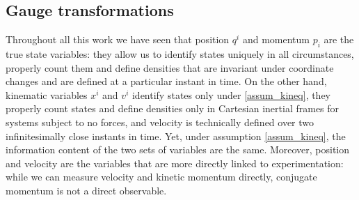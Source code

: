 \subsection{Gauge transformations}

Throughout all this work we have seen that position $q^i$ and momentum $p_i$ are the true state variables: they allow us to identify states uniquely in all circumstances, properly count them and define densities that are invariant under coordinate changes and are defined at a particular instant in time. On the other hand, kinematic variables $x^i$ and $v^i$ identify states only under \ref{assum_kineq}, they properly count states and define densities only in Cartesian inertial frames for systems subject to no forces, and velocity is technically defined over two infinitesimally close instants in time. Yet, under assumption \ref{assum_kineq}, the information content of the two sets of variables are the same. Moreover, position and velocity are the variables that are more directly linked to experimentation: while we can measure velocity and kinetic momentum directly, conjugate momentum is not a direct observable.

